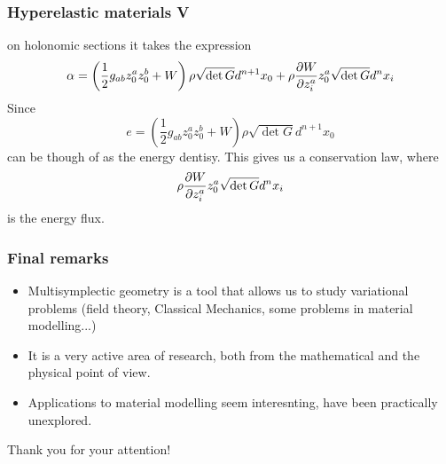 \begin{frame}
    \frametitle{Hyperelastic materials V}
    on holonomic sections it takes the expression
    $$\alpha =\left(  \frac{1}{2} g_{ab}z^a_0z^b_0 + W \right)\rho \sqrt{\det G} d^{n+1} x_0 + \rho \pdv{W}{z^a_i}z^a_0 \sqrt{\det G} d^n x_i$$
    Since $$e = \left(  \frac{1}{2} g_{ab}z^a_0z^b_0 + W \right)\rho \sqrt{\det G}d^{n+1}x_0$$ can be though of as the \alert{energy dentisy}.
    This gives us a conservation law, where $$\rho \pdv{W}{z^a_i}z^a_0 \sqrt{\det G} d^n x_i$$ is the energy flux.
\end{frame}

\begin{frame}
    \frametitle{Final remarks}
    \begin{itemize}
        \item Multisymplectic geometry is a tool that allows us to study variational problems (field theory, Classical Mechanics, 
        some problems in material modelling...)
        \item It is a very active area of research, both from the mathematical and the physical point of view.
        \item Applications to material modelling seem interesnting, have been practically unexplored.
    \end{itemize}
\end{frame}

\begin{frame}
    \nocite{*}
    \printbibliography
\end{frame}

\begin{frame}[plain]
    \begin{center}
        {\Large Thank you for your attention!}
    \end{center}
\end{frame}


